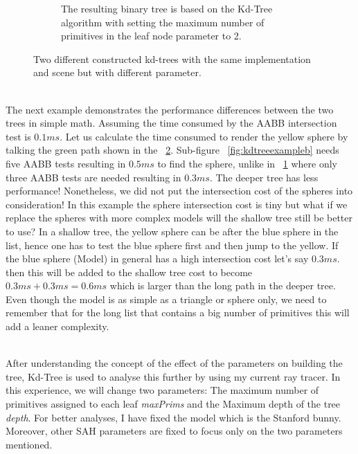 \documentclass[11pt,a4paper]{article}
\begin{document}
\begin{figure}[H]
\begin{subfigure}[b]{0.6\textwidth}
         \caption{The resulting binary tree is based on the Kd-Tree algorithm with setting the maximum number of primitives in the leaf node parameter to 2.
}
         \label{fig:kdtreeexampled}
     \end{subfigure}
        \captionsetup{justification=centering,margin=2cm}
        \caption{Two different constructed kd-trees with the same implementation and scene but with different parameter.}
        \label{fig:kdtreeexample}
\end{figure}

\noindent
\\
The next example demonstrates the performance differences between the two trees in simple math. Assuming the time consumed by the AABB intersection test is $0.1ms$. Let us calculate the time consumed to render the yellow sphere by talking the green path shown in the ~\ref{fig:kdtreeexample}. Sub-figure ~\ref{fig:kdtreeexampleb}
 needs five AABB tests resulting in $0.5ms$ to find the sphere, unlike in ~\ref{fig:kdtreeexampled}
 where only three AABB tests are needed resulting in $0.3ms$. The deeper tree has less performance! Nonetheless, we did not put the intersection cost of the spheres into consideration! In this example the sphere intersection cost is tiny but what if we replace the spheres with more complex models will the shallow tree still be better to use? In a shallow tree, the yellow sphere can be after the blue sphere in the list, hence one has to test the blue sphere first and then jump to the yellow. If the blue sphere (Model) in general has a high intersection cost let's say $0.3ms$. then this will be added to the shallow tree cost to become $0.3ms + 0.3ms = 0.6ms$ which is larger than the long path in the deeper tree. Even though the model is as simple as a triangle or sphere only, we need to remember that for the long list that contains a big number of primitives this will add a leaner complexity.

\noindent
\\
After understanding the concept of the effect of the parameters on building the tree, Kd-Tree is used to analyse this further by using my current ray tracer. In this experience, we will change two parameters: The maximum number of primitives assigned to each leaf \textit{maxPrims} and the Maximum depth of the tree \textit{depth}. For better analyses, I have fixed the model which is the Stanford bunny. Moreover, other SAH parameters are fixed to focus only on the two parameters mentioned. 
\end{document}
